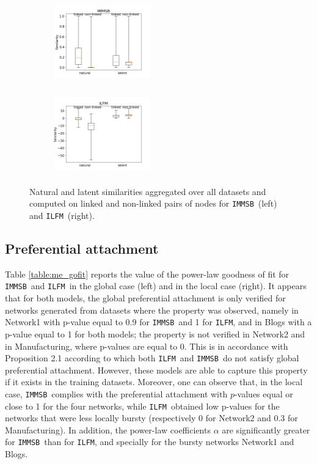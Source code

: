 \documentclass[9pt,twocolumn,twoside]{pnas-new}
\newcommand{\ifm}{\texttt{ILFM}}
\newcommand{\imb}{\texttt{IMMSB}}
\begin{document}
\begin{figure}[ht]
\centering
    \begin{subfigure}
       	 \centering
        	 \includegraphics[width=4.22cm,height=3.5cm]{img/corpus/homo_mustach_immsb}
    \end{subfigure}
    \begin{subfigure}
        	 \centering
          \includegraphics[width=4.22cm,height=3.5cm]{img/corpus/homo_mustach_ilfm}
    \end{subfigure}
    \caption{Natural and latent similarities aggregated over all datasets and computed on linked and non-linked pairs of nodes for \imb\ (left) and \ifm\ (right).}
    \label{fig:homo_mustach}
\end{figure}

\subsection{Preferential attachment}

Table \ref{table:me_gofit} reports the value of the power-law goodness of fit for \imb\ and \ifm\ in the global case (left) and in the local case (right). It appears that for both models, the global preferential attachment is only verified for networks generated from datasets where the property was observed, namely in Network1 with p-value equal to 0.9 for \imb\ and 1 for \ifm, and in Blogs with a p-value equal to 1 for both models; the property is not verified in Network2 and in Manufacturing, where p-values are equal to 0. This is in accordance with Proposition 2.1 according to which both \ifm\ and \imb\ do not satisfy global preferential attachment. However, these models are able to capture this property if it exists in the training datasets.  Moreover, one can observe that, in the local case, \imb\ complies with the preferential attachment with $p$-values equal or close to 1 for the four networks, while \ifm\ obtained low p-values for the networks that were less locally bursty (respectively  0  for Network2 and 0.3 for Manufacturing). In addition, the power-law coefficients $\alpha$ are significantly greater for \imb\ than for \ifm, and specially for the bursty networks Network1 and Blogs.
\end{document}

